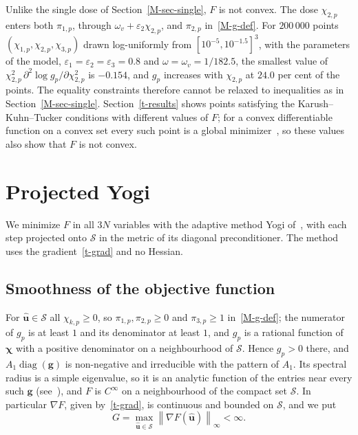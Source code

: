 \documentclass[11pt]{article}
\theoremstyle{plain}
\theoremstyle{remark}
\numberwithin{equation}{section}
\begin{document}
Unlike the single dose of Section~\ref{M-sec-single}, $F$ is not convex. The
dose $\chi_{2,p}$ enters both $\pi_{1,p}$, through
$\omega_v+\varepsilon_2\chi_{2,p}$, and $\pi_{2,p}$ in~\eqref{M-g-def}. For
$200\,000$ points $(\chi_{1,p},\chi_{2,p},\chi_{3,p})$ drawn log-uniformly from
$\left[10^{-5},10^{-1.5}\right]^3$, with the parameters of the model,
$\varepsilon_1=\varepsilon_2=\varepsilon_3=0.8$ and $\omega=\omega_v=1/182.5$,
the smallest value of $\chi_{2,p}^2\,\partial^2\log g_p/\partial \chi_{2,p}^2$
is $-0.154$, and $g_p$ increases with $\chi_{2,p}$ at $24.0$ per cent of the
points. The equality constraints therefore cannot be relaxed to inequalities as
in Section~\ref{M-sec-single}. Section~\ref{t-results} shows points satisfying
the Karush--Kuhn--Tucker conditions with different values of $F$; for a convex
differentiable function on a convex set every such point is a global
minimizer~\cite[Section 4.2.3]{2004Boyd_Vandenberghe}, so these values also
show that $F$ is not convex.

\section{Projected Yogi}\label{t-yogi}

We minimize $F$ in all $3N$ variables with the adaptive method Yogi
of~\cite{2018Zaheer_Yogi}, with each step projected onto $\mathcal{S}$ in the metric of its diagonal preconditioner.
The method uses the gradient~\eqref{t-grad} and no Hessian.

\subsection{Smoothness of the objective function}

For $\widehat{\bm u}\in\mathcal{S}$ all $\chi_{k,p}\ge 0$, so
$\pi_{1,p},\pi_{2,p}\ge 0$ and $\pi_{3,p}\ge 1$ in~\eqref{M-g-def}; the
numerator of $g_p$ is at least $1$ and its denominator at least $1$, and $g_p$
is a rational function of $\bm\chi$ with a positive denominator on a
neighbourhood of $\mathcal{S}$. Hence $g_p>0$ there, and
$A_1\operatorname{diag}(\bm g)$ is non-negative and irreducible with the
pattern of $A_1$. Its spectral radius is a simple eigenvalue, so it is an
analytic function of the entries near every such $\bm g$
(see~\cite[Section 6.3]{1985Horn_Johnson}), and $F$ is $C^\infty$ on a
neighbourhood of the compact set $\mathcal{S}$. In particular $\nabla F$,
given by~\eqref{t-grad}, is continuous and bounded on $\mathcal{S}$, and we
put
\begin{equation}\label{t-G}
G=\max_{\widehat{\bm u}\in\mathcal{S}}\left\|\nabla F\left(\widehat{\bm u}\right)\right\|_\infty<\infty .
\end{equation}
\end{document}
